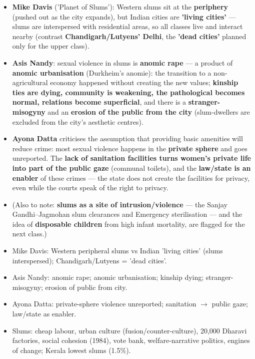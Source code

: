 \begin{KeyConcept}
\begin{itemize}
\item \textbf{Mike Davis} ('Planet of Slums'): Western slums sit at the \textbf{periphery} (pushed out as the city expands), but Indian cities are \textbf{'living cities'} --- slums are interspersed with residential areas, so all classes live and interact nearby (contrast \textbf{Chandigarh/Lutyens' Delhi}, the \textbf{'dead cities'} planned only for the upper class).
\item \textbf{Asis Nandy}: sexual violence in slums is \textbf{anomic rape} --- a product of \textbf{anomic urbanisation} (Durkheim's anomie): the transition to a non-agricultural economy happened without creating the new values; \textbf{kinship ties are dying, community is weakening, the pathological becomes normal, relations become superficial}, and there is a \textbf{stranger-misogyny} and an \textbf{erosion of the public from the city} (slum-dwellers are excluded from the city's aesthetic centres).
\item \textbf{Ayona Datta} criticises the assumption that providing basic amenities will reduce crime: most sexual violence happens in the \textbf{private sphere} and goes unreported. The \textbf{lack of sanitation facilities turns women's private life into part of the public gaze} (communal toilets), and the \textbf{law/state is an enabler} of these crimes --- the state does not create the facilities for privacy, even while the courts speak of the right to privacy.
\item (Also to note: \textbf{slums as a site of intrusion/violence} --- the Sanjay Gandhi--Jagmohan slum clearances and Emergency sterilisation --- and the idea of \textbf{disposable children} from high infant mortality, are flagged for the next class.)
\end{itemize}
\end{KeyConcept}

\begin{QuickRevision}
\begin{itemize}
\item Mike Davis: Western peripheral slums vs Indian 'living cities' (slums interspersed); Chandigarh/Lutyens = 'dead cities'.
\item Asis Nandy: anomic rape; anomic urbanisation; kinship dying; stranger-misogyny; erosion of public from city.
\item Ayona Datta: private-sphere violence unreported; sanitation $\rightarrow$ public gaze; law/state as enabler.
\item Slums: cheap labour, urban culture (fusion/counter-culture), 20,000 Dharavi factories, social cohesion (1984), vote bank, welfare-narrative politics, engines of change; Kerala lowest slums (1.5\%).
\end{itemize}
\end{QuickRevision}

